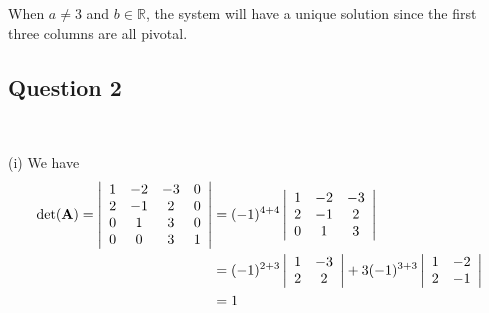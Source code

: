 \documentclass[12pt]{amsart}
\theoremstyle{plain}
\theoremstyle{definition}
\def\mb{\mathbb}
\def\bf{\textbf}
\begin{document}
\noindent When $a\neq 3$ and $b\in\mb R$, the system will have a unique solution since the first three columns are all pivotal.

\newpage
\subsection*{Question 2}\ 

(i) We have
\begin{align*}
	\det(\bf A)=\left|
	\begin{array}{cccc}
		1 & -2 & -3 & 0\\
		2 & -1 & 2 & 0\\
		0 & 1 & 3 & 0\\
		0 & 0 & 3 & 1\\
	\end{array}
	\right|&=(-1)^{4+4}\left|
	\begin{array}{cccc}
		1 & -2 & -3 \\
		2 & -1 & 2\\
		0 & 1 & 3\\
	\end{array}
	\right|\\
	&=
	(-1)^{2+3}\left|
	\begin{array}{cccc}
		1  & -3 \\
		2  & 2\\
	\end{array}
	\right|+3(-1)^{3+3}
	\left|
	\begin{array}{cccc}
		1 & -2 \\
		2 & -1 \\
	\end{array}
	\right|\\
	&=1
\end{align*}
\end{document}
